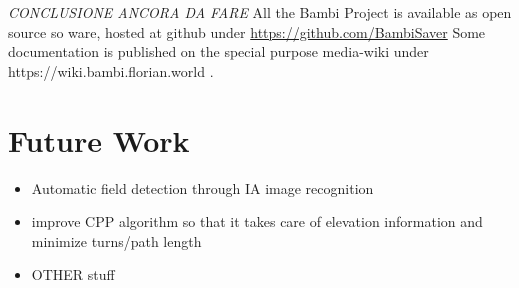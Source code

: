 \textit{CONCLUSIONE ANCORA DA FARE}
All the Bambi Project is available as open source so ware, hosted at github under \url{https://github.com/BambiSaver} Some documentation is published on the special purpose
media-wiki under https://wiki.bambi.florian.world .
\section{Future Work} %
\label{sec:section_name}
\begin{itemize}
	\item Automatic field detection through IA image recognition
	\item improve CPP algorithm so that it takes care of elevation information and minimize turns/path length
	\item OTHER stuff
\end{itemize}
